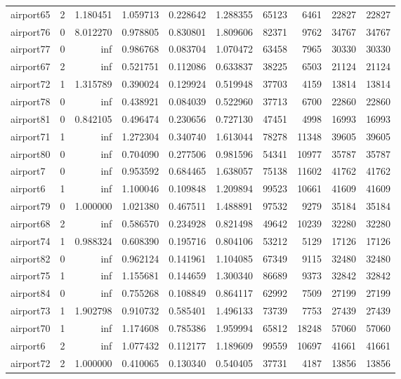 \begin{longtable}{|l|r|r|r|r|r|r|r|r|r|}
airport65 & 2 & 1.180451 & 1.059713 & 0.228642 & 1.288355 & 65123 & 6461 & 22827 & 22827 \\
airport76 & 0 & 8.012270 & 0.978805 & 0.830801 & 1.809606 & 82371 & 9762 & 34767 & 34767 \\
airport77 & 0 & inf & 0.986768 & 0.083704 & 1.070472 & 63458 & 7965 & 30330 & 30330 \\
airport67 & 2 & inf & 0.521751 & 0.112086 & 0.633837 & 38225 & 6503 & 21124 & 21124 \\
airport72 & 1 & 1.315789 & 0.390024 & 0.129924 & 0.519948 & 37703 & 4159 & 13814 & 13814 \\
airport78 & 0 & inf & 0.438921 & 0.084039 & 0.522960 & 37713 & 6700 & 22860 & 22860 \\
airport81 & 0 & 0.842105 & 0.496474 & 0.230656 & 0.727130 & 47451 & 4998 & 16993 & 16993 \\
airport71 & 1 & inf & 1.272304 & 0.340740 & 1.613044 & 78278 & 11348 & 39605 & 39605 \\
airport80 & 0 & inf & 0.704090 & 0.277506 & 0.981596 & 54341 & 10977 & 35787 & 35787 \\
airport7 & 0 & inf & 0.953592 & 0.684465 & 1.638057 & 75138 & 11602 & 41762 & 41762 \\
airport6 & 1 & inf & 1.100046 & 0.109848 & 1.209894 & 99523 & 10661 & 41609 & 41609 \\
airport79 & 0 & 1.000000 & 1.021380 & 0.467511 & 1.488891 & 97532 & 9279 & 35184 & 35184 \\
airport68 & 2 & inf & 0.586570 & 0.234928 & 0.821498 & 49642 & 10239 & 32280 & 32280 \\
airport74 & 1 & 0.988324 & 0.608390 & 0.195716 & 0.804106 & 53212 & 5129 & 17126 & 17126 \\
airport82 & 0 & inf & 0.962124 & 0.141961 & 1.104085 & 67349 & 9115 & 32480 & 32480 \\
airport75 & 1 & inf & 1.155681 & 0.144659 & 1.300340 & 86689 & 9373 & 32842 & 32842 \\
airport84 & 0 & inf & 0.755268 & 0.108849 & 0.864117 & 62992 & 7509 & 27199 & 27199 \\
airport73 & 1 & 1.902798 & 0.910732 & 0.585401 & 1.496133 & 73739 & 7753 & 27439 & 27439 \\
airport70 & 1 & inf & 1.174608 & 0.785386 & 1.959994 & 65812 & 18248 & 57060 & 57060 \\
airport6 & 2 & inf & 1.077432 & 0.112177 & 1.189609 & 99559 & 10697 & 41661 & 41661 \\
airport72 & 2 & 1.000000 & 0.410065 & 0.130340 & 0.540405 & 37731 & 4187 & 13856 & 13856 \\

\end{longtable}

